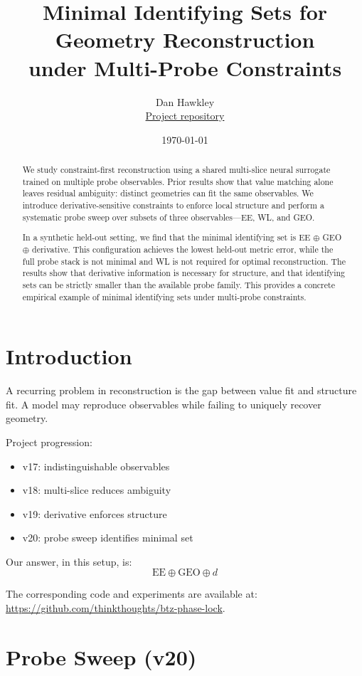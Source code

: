 \documentclass[11pt]{article}
\title{\textbf{Minimal Identifying Sets for Geometry Reconstruction}\\
under Multi-Probe Constraints}
\author{
Dan Hawkley \\
\href{https://github.com/thinkthoughts/btz-phase-lock}{Project repository}
}
\date{\today}
\begin{document}
\maketitle

\begin{abstract}
We study constraint-first reconstruction using a shared multi-slice neural surrogate trained on multiple probe observables. Prior results show that value matching alone leaves residual ambiguity: distinct geometries can fit the same observables. We introduce derivative-sensitive constraints to enforce local structure and perform a systematic probe sweep over subsets of three observables---EE, WL, and GEO.

In a synthetic held-out setting, we find that the minimal identifying set is EE $\oplus$ GEO $\oplus$ derivative. This configuration achieves the lowest held-out metric error, while the full probe stack is not minimal and WL is not required for optimal reconstruction. The results show that derivative information is necessary for structure, and that identifying sets can be strictly smaller than the available probe family. This provides a concrete empirical example of minimal identifying sets under multi-probe constraints.
\end{abstract}

\section{Introduction}

A recurring problem in reconstruction is the gap between value fit and structure fit. A model may reproduce observables while failing to uniquely recover geometry.

Project progression:
\begin{itemize}
\item v17: indistinguishable observables
\item v18: multi-slice reduces ambiguity
\item v19: derivative enforces structure
\item v20: probe sweep identifies minimal set
\end{itemize}

Our answer, in this setup, is:
\[
\boxed{\text{EE} \oplus \text{GEO} \oplus d}
\]

The corresponding code and experiments are available at:
\url{https://github.com/thinkthoughts/btz-phase-lock}.

\section{Probe Sweep (v20)}
\end{document}
